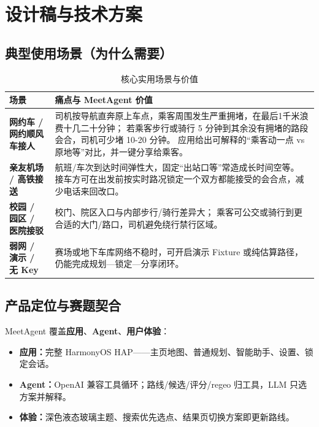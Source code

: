 \documentclass[UTF8,a4paper,zihao=-4]{ctexart}
\begin{document}
\section{设计稿与技术方案}

\subsection{典型使用场景（为什么需要）}

\begin{table}[H]
\centering
{}
\begin{tabularx}{\textwidth}{>{\bfseries}p{2.4cm}X}
\toprule
场景 & 痛点与 MeetAgent 价值 \\
\midrule
网约车 / 网约顺风车接人 &
司机按导航直奔原上车点，乘客周围发生严重拥堵，在最后1千米浪费十几二十分钟；
若乘客步行或骑行 5 分钟到其余没有拥堵的路段会合，司机可少堵 10-20 分钟。
应用给出可解释的“乘客动一点 vs 原地等”对比，并一键分享给乘客。 \\
亲友机场 / 高铁接送 &
航班/车次到达时间弹性大，固定“出站口等”常造成长时间空等。
接车方可在出发前按实时路况锁定一个双方都能接受的会合点，减少电话来回改口。 \\
校园 / 园区 / 医院接驳 &
校门、院区入口与内部步行/骑行差异大；
乘客可公交或骑行到更合适的大门/路口，司机避免绕行禁行区域。 \\
弱网 / 演示 / 无 Key &
赛场或地下车库网络不稳时，可开启演示 Fixture 或纯估算路径，
仍能完成规划—锁定—分享闭环。 \\
\bottomrule
\end{tabularx}
\caption{核心实用场景与价值}
\label{tab:scenarios}
\end{table}

\subsection{产品定位与赛题契合}

MeetAgent 覆盖\textbf{应用}、\textbf{Agent}、\textbf{用户体验}：

\begin{itemize}
  \item \textbf{应用：}完整 HarmonyOS HAP——主页地图、普通规划、智能助手、设置、锁定会话。
  \item \textbf{Agent：}OpenAI 兼容工具循环；路线/候选/评分/regeo 归工具，LLM 只选方案并解释。
  \item \textbf{体验：}深色液态玻璃主题、搜索优先选点、结果页切换方案即更新路线。
\end{itemize}
\end{document}

